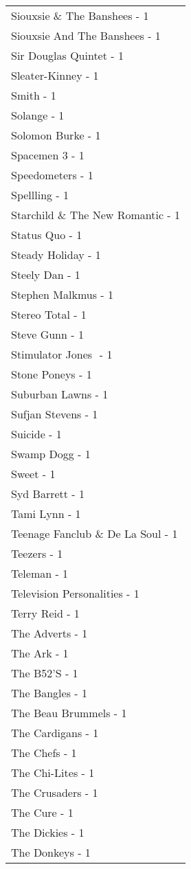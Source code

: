 \documentclass[
]{article}
\begin{document}
\begin{longtable}{l}
Siouxsie \& The Banshees - 1 \\ 
Siouxsie And The Banshees - 1 \\ 
Sir Douglas Quintet - 1 \\ 
Sleater-Kinney - 1 \\ 
Smith - 1 \\ 
Solange - 1 \\ 
Solomon Burke - 1 \\ 
Spacemen 3 - 1 \\ 
Speedometers - 1 \\ 
Spellling - 1 \\ 
Starchild \& The New Romantic - 1 \\ 
Status Quo - 1 \\ 
Steady Holiday - 1 \\ 
Steely Dan - 1 \\ 
Stephen Malkmus - 1 \\ 
Stereo Total - 1 \\ 
Steve Gunn - 1 \\ 
Stimulator Jones ‎ - 1 \\ 
Stone Poneys - 1 \\ 
Suburban Lawns - 1 \\ 
Sufjan Stevens - 1 \\ 
Suicide - 1 \\ 
Swamp Dogg - 1 \\ 
Sweet - 1 \\ 
Syd Barrett - 1 \\ 
Tami Lynn - 1 \\ 
Teenage Fanclub \& De La Soul - 1 \\ 
Teezers - 1 \\ 
Teleman - 1 \\ 
Television Personalities - 1 \\ 
Terry Reid - 1 \\ 
The Adverts - 1 \\ 
The Ark - 1 \\ 
The B52'S - 1 \\ 
The Bangles - 1 \\ 
The Beau Brummels - 1 \\ 
The Cardigans - 1 \\ 
The Chefs - 1 \\ 
The Chi-Lites - 1 \\ 
The Crusaders - 1 \\ 
The Cure - 1 \\ 
The Dickies - 1 \\ 
The Donkeys - 1 \\ 

\end{longtable}
\end{document}
